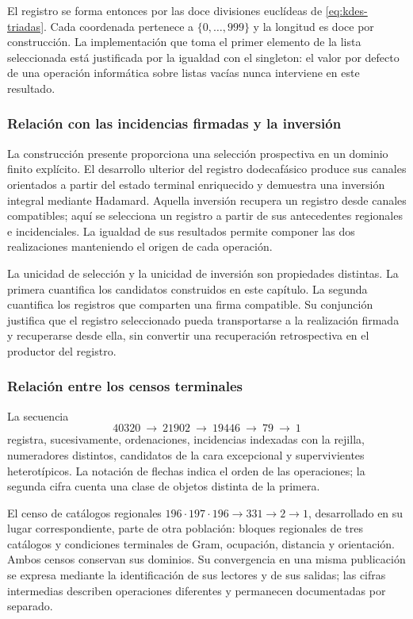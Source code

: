 El registro se forma entonces por las doce divisiones euclídeas de
\eqref{eq:kdes-triadas}. Cada coordenada pertenece a
$\{0,\ldots,999\}$ y la longitud es doce por construcción. La
implementación que toma el primer elemento de la lista seleccionada
está justificada por la igualdad con el singleton: el valor por defecto
de una operación informática sobre listas vacías nunca interviene en
este resultado.

\subsubsection{Relación con las incidencias firmadas y la inversión}

La construcción presente proporciona una selección prospectiva en un
dominio finito explícito. El desarrollo ulterior del registro
dodecafásico produce sus canales orientados a partir del estado
terminal enriquecido y demuestra una inversión integral mediante
Hadamard. Aquella inversión recupera un registro desde canales
compatibles; aquí se selecciona un registro a partir de sus
antecedentes regionales e incidenciales. La igualdad de sus resultados
permite componer las dos realizaciones manteniendo el origen de cada
operación.

La unicidad de selección y la unicidad de inversión son propiedades
distintas. La primera cuantifica los candidatos construidos en este
capítulo. La segunda cuantifica los registros que comparten una firma
compatible. Su conjunción justifica que el registro seleccionado pueda
transportarse a la realización firmada y recuperarse desde ella, sin
convertir una recuperación retrospectiva en el productor del registro.

\subsubsection{Relación entre los censos terminales}

La secuencia
\[
 40320\ \longrightarrow\ 21902\ \longrightarrow\ 19446
 \ \longrightarrow\ 79\ \longrightarrow\ 1
\]
registra, sucesivamente, ordenaciones, incidencias indexadas con la
rejilla, numeradores distintos, candidatos de la cara excepcional y
supervivientes heterotípicos. La notación de flechas indica el orden de
las operaciones; la segunda cifra cuenta una clase de objetos
distinta de la primera.

El censo de catálogos regionales
$196\cdot197\cdot196\longrightarrow331\longrightarrow2
\longrightarrow1$, desarrollado en su lugar correspondiente, parte de
otra población: bloques regionales de tres catálogos y condiciones
terminales de Gram, ocupación, distancia y orientación. Ambos censos
conservan sus dominios. Su convergencia en una misma publicación se
expresa mediante la identificación de sus lectores y de sus salidas;
las cifras intermedias describen operaciones diferentes y permanecen
documentadas por separado.

